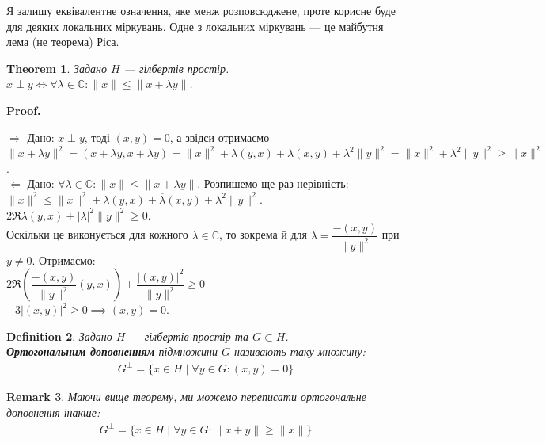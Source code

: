 \documentclass[a4paper, 10pt]{article}
\makeatletter
\def\rightproof{$\boxed{\Rightarrow}$ }
\def\leftproof{$\boxed{\Leftarrow}$ }
\theoremstyle{theoremdd}
\newtheorem{theorem}{Theorem}[subsection]
\theoremstyle{theoremdd}
\newtheorem{definition}[theorem]{Definition}
\theoremstyle{theoremdd}
\theoremstyle{theoremdd}
\theoremstyle{theoremdd}
\theoremstyle{theoremdd}
\newtheorem{remark}[theorem]{Remark}
\theoremstyle{theoremdd}
\theoremstyle{theoremdd}
\renewenvironment{proof}[1][Proof.\\]{\par
\pushQED{\hfill \qed}%
\normalfont \topsep6\p@\@plus6\p@\relax
\trivlist
\item\relax
{\bfseries
#1\@addpunct{.}}\hspace\labelsep\ignorespaces
}{%
\popQED\endtrivlist\@endpefalse
}
\makeatother
\begin{document}
\noindent Я залишу еквівалентне означення, яке менж розповсюджене, проте корисне буде для деяких локальних міркувань. Одне з локальних міркувань --- це майбутня лема (не теорема) Ріса.

\begin{theorem}
Задано $H$ --- гілбертів простір.\\
$x \perp y \iff \forall \lambda \in \mathbb{C}: \|x\| \leq \|x + \lambda y\|$.
\end{theorem}

\begin{proof}
\rightproof Дано: $x \perp y$, тоді $(x,y) = 0$, а звідси отримаємо\\
$\|x + \lambda y\|^2 = (x+\lambda y, x+\lambda y) = \|x\|^2 + \lambda (y,x) + \overline{\lambda}(x,y) + \lambda^2 \|y\|^2 = \|x\|^2 + \lambda^2 \|y\|^2 \geq \|x\|^2$.
\bigskip \\
\leftproof Дано: $\forall \lambda \in \mathbb{C}: \|x\| \leq \|x + \lambda y\|$. Розпишемо ще раз нерівність:\\
$\|x\|^2 \leq \|x\|^2 + \lambda (y,x) + \overline{\lambda}(x,y) + \lambda^2 \|y\|^2$.\\
$2 \Re \lambda (y,x) + |\lambda|^2 \|y\|^2 \geq 0$.\\
Оскільки це виконується для кожного $\lambda \in \mathbb{C}$, то зокрема й для $\lambda = \dfrac{-(x,y)}{\|y\|^2}$ при $y \neq 0$. Отримаємо:\\
$2 \Re \left( \dfrac{-(x,y)}{\|y\|^2} (y,x) \right) + \dfrac{|(x,y)|^2}{\|y\|^2}  \geq 0$\\
$-3 |(x,y)|^2 \geq 0 \implies (x,y) = 0$.
\end{proof}

\begin{definition}
Задано $H$ --- гілбертів простір та $G \subset H$.\\
\textbf{Ортогональним доповненням} підмножини $G$ називають таку множину:
\begin{align*}
G^\perp = \{x \in H \mid \forall y \in G: (x,y) = 0\}
\end{align*}
\end{definition}

\begin{remark}
Маючи вище теорему, ми можемо переписати ортогональне доповнення інакше:
\begin{align*}
G^\perp = \{x \in H \mid \forall y \in G: \|x+y\| \geq \|x\|\}
\end{align*}
\end{remark}
\end{document}
